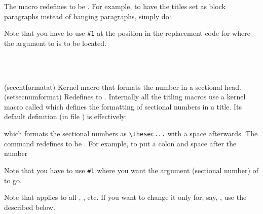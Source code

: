 The \cmd{\sethangfrom} macro redefines \cmd{\@hangfrom} to be .
For example, to have the titles set as block paragraphs instead of hanging
paragraphs, simply do:
\begin{lcode}
\end{lcode}
Note that you have to use \verb?#1? at the position in the replacement
code for \cmd{\@hangfrom} where the argument to \cmd{\@hangfrom}
is to be located.

\begin{syntax}
\cmd{\@seccntformat} \\
\cmd{\setsecnumformat} \\
\end{syntax}
\glossary(seccntformatat)%
  {}%
  {Kernel macro that formats the number in a sectional head.}
\glossary(setsecnumformat)%
  {}%
  {Redefines  to .}
Internally all the titling macros use a kernel macro called
\cmd{\@seccntformat}
which defines the formatting of sectional numbers in a title. Its
default definition (in file ) is effectively:
\begin{lcode}
\newcommand{\@seccntformat}[1]{\csname the#1\endcsname\quad}
\end{lcode}
which formats the sectional numbers as \verb?\thesec...? with a space
afterwards.
The command \cmd{\setsecnumformat} redefines \cmd{\@seccntformat}
to be .
For example, to put a colon and space after the number
\begin{lcode}
\end{lcode}
Note that you have to use \verb?#1? where you want the argument
(sectional number) of \cmd{\@seccntformat} to go.

Note that \cmd{\setsecnumformat} applies to all \cmd{\section},
\cmd{\subsection}, etc. If you want to change it only for, say,
\cmd{\subsection}, use the \cmd{\setsubsechook} described below.


